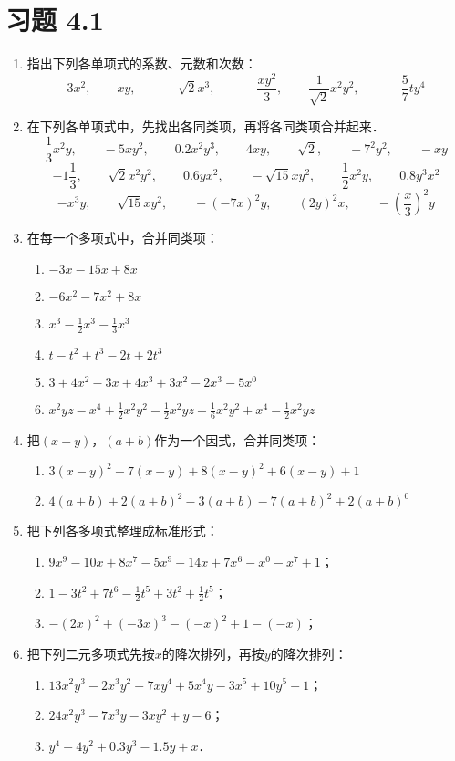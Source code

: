 \section*{习题 4.1}
\begin{enumerate}
    \item 指出下列各单项式的系数、元数和次数：
    \[3x^2,\qquad xy,\qquad -\sqrt{2}x^3,\qquad -\frac{xy^2}{3},\qquad \frac{1}{\sqrt{2}}x^2y^2,\qquad -\frac{5}{7}ty^4 \]
\item  在下列各单项式中，先找出各同类项，再将各同类项合并起来．
\[\frac{1}{3}x^2y,\qquad  -5xy^2,\qquad 0.2x^2y^3,\qquad  4xy,\qquad \sqrt{2},\qquad  -7^2y^2,\qquad  -xy\]
\[-1\frac{1}{3},\qquad  \sqrt{2}x^2y^2,\qquad  0.6yx^2,\qquad  -\sqrt{15}xy^2,\qquad  \frac{1}{2}x^2y,\qquad  0.8y^3x^2\]
\[-x^3y,\qquad \sqrt{15}xy^2,\qquad  -(-7x)^2 y,\qquad  (2y)^2x,\qquad -\left(\frac{x}{3}\right)^2y\]
\item  在每一个多项式中，合并同类项：
\begin{enumerate}
    \item $-3x-15x+8x$
    \item $-6x^2-7x^2+8x$
    \item $x^3-\frac{1}{2}x^3-\frac{1}{3}x^3$
    \item $t-t^2+t^3-2t+2t^3$
    \item $3+4x^2-3x+4x^3+3x^2-2x^3-5x^0$
    \item $x^2yz-x^4+\frac{1}{2}x^2y^2-\frac{1}{2}x^2yz-\frac{1}{6}x^2y^2+x^4-\frac{1}{2}x^2yz$
\end{enumerate}

\item 把$(x-y)$，$(a+b)$作为一个因式，合并同类项：
\begin{enumerate}
    \item $3(x-y)^2-7(x-y)+8(x-y)^2+6(x-y)+1$
    \item $4(a+b)+2(a+b)^2-3(a+b)-7(a+b)^2+2(a+b)^0$
\end{enumerate}

\item 把下列各多项式整理成标准形式：
\begin{enumerate}
    \item $9x^9-10x+8x^7-5x^9-14x+7x^6-x^0-x^7+1$；
    \item $1-3t^2+7t^6-\frac{1}{2}t^5+3t^2+\frac{1}{2}t^5$；
    \item $-(2x)^2+(-3x)^3-(-x)^2+1-(-x)$；
\end{enumerate}

\item 把下列二元多项式先按$x$的降次排列，再按$y$的降次排列：
\begin{enumerate}
    \item $13x^2y^3-2x^3y^2-7xy^4+5x^4y-3x^5+10y^5-1$；
    \item $24x^2y^3-7x^3y-3xy^2+y-6$；
    \item $y^4-4y^2+0.3y^3-1.5y+x$．
\end{enumerate}



\end{enumerate}
